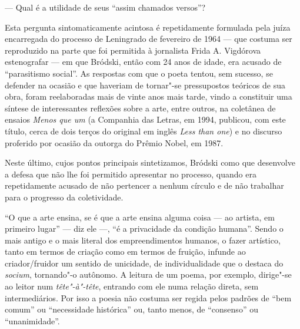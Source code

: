 {{{--- Qual é a utilidade de seus ``assim chamados versos''?

Esta pergunta sintomaticamente acintosa é repetidamente formulada pela
juíza encarregada do processo de Leningrado de fevereiro de 1964 ---
que costuma ser reproduzido na parte que foi permitida à jornalista Frida A.
Vigdórova estenografar --- em que Bródski, então com 24 anos de idade,
era acusado de ``parasitismo social''. As respostas com que o poeta
tentou, sem sucesso, se defender na ocasião e que haveriam de tornar"-se
pressupostos teóricos de sua obra, foram reelaboradas mais de vinte anos
mais tarde, vindo a constituir uma síntese de interessantes reflexões
sobre a arte, entre outros, na coletânea de ensaios \emph{Menos que um}
(a Companhia das Letras, em 1994, publicou, com este título, cerca de
dois terços do original em inglês \emph{Less than one}) e no
discurso proferido por ocasião da outorga do Prêmio Nobel, em 1987.

Neste último, cujos pontos principais sintetizamos, Bródski como que
desenvolve a defesa que não lhe foi permitido apresentar no processo,
quando era repetidamente acusado de não pertencer a nenhum círculo e de
não trabalhar para o progresso da coletividade.

``O que a arte ensina, se é que a arte ensina alguma coisa --- ao
artista, em primeiro lugar'' --- diz ele ---, ``é a privacidade da
condição humana''. Sendo o mais antigo e o mais literal dos
empreendimentos humanos, o fazer artístico, tanto em termos de criação
como em termos de fruição, infunde ao criador/fruidor um sentido de
unicidade, de individualidade que o destaca do \emph{socium}, tornando"-o
autônomo. A leitura de um poema, por exemplo, dirige"-se ao leitor num
\emph{tête"-à"-tête}, entrando com ele numa relação direta, sem
intermediários. Por isso a poesia não costuma ser regida pelos padrões
de ``bem comum'' ou ``necessidade histórica'' ou, tanto menos, de
``consenso'' ou ``unanimidade''.

}}}
